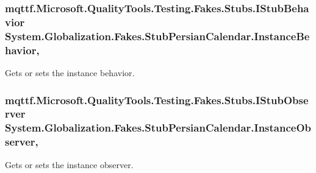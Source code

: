 \hypertarget{class_system_1_1_globalization_1_1_fakes_1_1_stub_persian_calendar_aec684a12a91eb7e60a6051625647ad68}{
\subsubsection[{Instance\-Behavior}]{\setlength{\rightskip}{0pt plus 5cm}mqttf.\-Microsoft.\-Quality\-Tools.\-Testing.\-Fakes.\-Stubs.\-I\-Stub\-Behavior System.\-Globalization.\-Fakes.\-Stub\-Persian\-Calendar.\-Instance\-Behavior\hspace{0.3cm}{\ttfamily [get]}, {\ttfamily [set]}}}\label{class_system_1_1_globalization_1_1_fakes_1_1_stub_persian_calendar_aec684a12a91eb7e60a6051625647ad68}


Gets or sets the instance behavior.

\hypertarget{class_system_1_1_globalization_1_1_fakes_1_1_stub_persian_calendar_ae9d8c5e221a6f97d031deffe4d14b72a}{
\subsubsection[{Instance\-Observer}]{\setlength{\rightskip}{0pt plus 5cm}mqttf.\-Microsoft.\-Quality\-Tools.\-Testing.\-Fakes.\-Stubs.\-I\-Stub\-Observer System.\-Globalization.\-Fakes.\-Stub\-Persian\-Calendar.\-Instance\-Observer\hspace{0.3cm}{\ttfamily [get]}, {\ttfamily [set]}}}\label{class_system_1_1_globalization_1_1_fakes_1_1_stub_persian_calendar_ae9d8c5e221a6f97d031deffe4d14b72a}


Gets or sets the instance observer.

